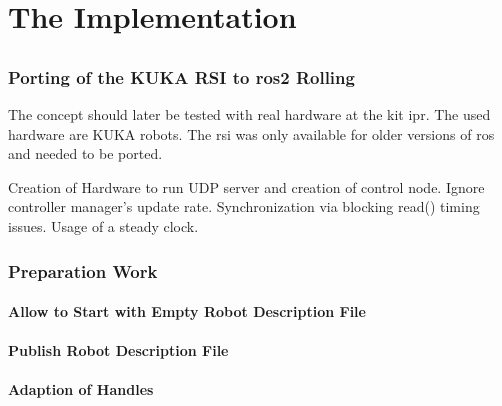 \part{The Implementation}
\chapter{}
\label{sec:implementation}

\section{Porting of the KUKA RSI to \gls{ros2} Rolling}
The concept should later be tested with real hardware at the \gls{kit} \gls{ipr}. The used hardware are KUKA robots. The \gls{rsi} was only available for older versions of \gls{ros} and needed to be ported.\newline


Creation of Hardware to run UDP server and creation of control node. Ignore controller manager's update rate. Synchronization via blocking read() timing issues. Usage of a steady clock.

\section{Preparation Work}

\subsection{Allow to Start with Empty Robot Description File}

\subsection{Publish Robot Description File}

\subsection{Adaption of Handles}

